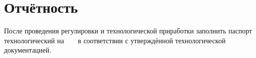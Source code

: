 
\section{Отчётность}
  После проведения регулировки и технологической приработки заполнить 
	 паспорт технологический на \DocProductShortTitle~ \DocProductSignature~ в соответствии с 
	 утверждённой технологической документацией.
